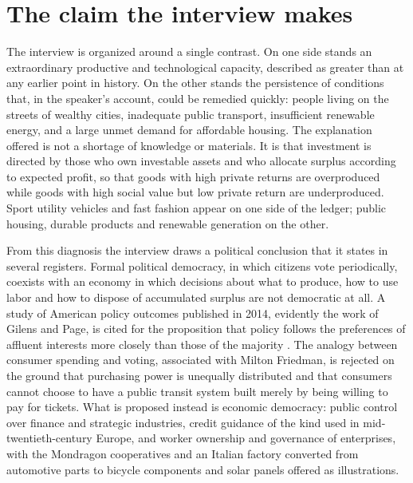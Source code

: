 \documentclass[12pt]{article}
\theoremstyle{definition}
\begin{document}
\section{The claim the interview makes}

The interview \cite{hickelfrancois} is organized around a single contrast. On one side stands an extraordinary productive and technological capacity, described as greater than at any earlier point in history. On the other stands the persistence of conditions that, in the speaker's account, could be remedied quickly: people living on the streets of wealthy cities, inadequate public transport, insufficient renewable energy, and a large unmet demand for affordable housing. The explanation offered is not a shortage of knowledge or materials. It is that investment is directed by those who own investable assets and who allocate surplus according to expected profit, so that goods with high private returns are overproduced while goods with high social value but low private return are underproduced. Sport utility vehicles and fast fashion appear on one side of the ledger; public housing, durable products and renewable generation on the other.

From this diagnosis the interview draws a political conclusion that it states in several registers. Formal political democracy, in which citizens vote periodically, coexists with an economy in which decisions about what to produce, how to use labor and how to dispose of accumulated surplus are not democratic at all. A study of American policy outcomes published in 2014, evidently the work of Gilens and Page, is cited for the proposition that policy follows the preferences of affluent interests more closely than those of the majority \cite{gilens2014}. The analogy between consumer spending and voting, associated with Milton Friedman, is rejected on the ground that purchasing power is unequally distributed and that consumers cannot choose to have a public transit system built merely by being willing to pay for tickets. What is proposed instead is economic democracy: public control over finance and strategic industries, credit guidance of the kind used in mid-twentieth-century Europe, and worker ownership and governance of enterprises, with the Mondragon cooperatives and an Italian factory converted from automotive parts to bicycle components and solar panels offered as illustrations.
\end{document}
